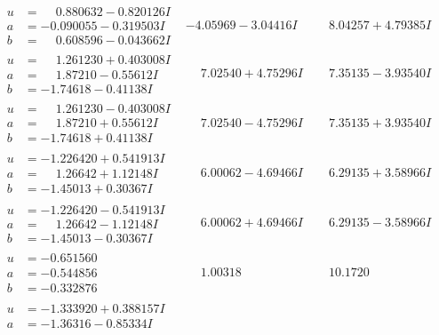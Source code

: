 \documentclass[1p]{elsarticle_modified}
\theoremstyle{definition}
\begin{document}
$$\begin{array}{c|c|c}
\begin{aligned}
u &= \phantom{-}0.880632 - 0.820126 I \\
a &= -0.090055 - 0.319503 I \\
b &= \phantom{-}0.608596 - 0.043662 I\end{aligned}
 & -4.05969 - 3.04416 I & \phantom{-}8.04257 + 4.79385 I \\ \hline\begin{aligned}
u &= \phantom{-}1.261230 + 0.403008 I \\
a &= \phantom{-}1.87210 - 0.55612 I \\
b &= -1.74618 - 0.41138 I\end{aligned}
 & \phantom{-}7.02540 + 4.75296 I & \phantom{-}7.35135 - 3.93540 I \\ \hline\begin{aligned}
u &= \phantom{-}1.261230 - 0.403008 I \\
a &= \phantom{-}1.87210 + 0.55612 I \\
b &= -1.74618 + 0.41138 I\end{aligned}
 & \phantom{-}7.02540 - 4.75296 I & \phantom{-}7.35135 + 3.93540 I \\ \hline\begin{aligned}
u &= -1.226420 + 0.541913 I \\
a &= \phantom{-}1.26642 + 1.12148 I \\
b &= -1.45013 + 0.30367 I\end{aligned}
 & \phantom{-}6.00062 - 4.69466 I & \phantom{-}6.29135 + 3.58966 I \\ \hline\begin{aligned}
u &= -1.226420 - 0.541913 I \\
a &= \phantom{-}1.26642 - 1.12148 I \\
b &= -1.45013 - 0.30367 I\end{aligned}
 & \phantom{-}6.00062 + 4.69466 I & \phantom{-}6.29135 - 3.58966 I \\ \hline\begin{aligned}
u &= -0.651560\phantom{ +0.000000I} \\
a &= -0.544856\phantom{ +0.000000I} \\
b &= -0.332876\phantom{ +0.000000I}\end{aligned}
 & \phantom{-}1.00318\phantom{ +0.000000I} & \phantom{-}10.1720\phantom{ +0.000000I} \\ \hline\begin{aligned}
u &= -1.333920 + 0.388157 I \\
a &= -1.36316 - 0.85334 I \\

\end{aligned}
\end{array}$$
\end{document}
